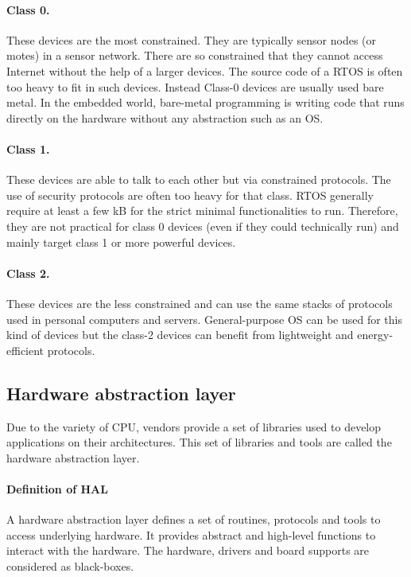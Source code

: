 \paragraph{Class 0.}
These devices are the most constrained.
They are typically sensor nodes (or motes) in a sensor network.
There are so constrained that they cannot access Internet without the help of a larger devices.
The source code of a RTOS is often too heavy to fit in such devices.
Instead Class-0 devices are usually used bare metal.
In the embedded world, bare-metal programming is writing code that runs directly on the hardware without any abstraction such as an OS.

\paragraph{Class 1.}
These devices are able to talk to each other but via constrained protocols.
The use of security protocols are often too heavy for that class.
RTOS generally require at least a few kB for the strict minimal functionalities to run.
Therefore, they are not practical for class 0 devices (even if they could technically run) and mainly target class 1 or more powerful devices.


\paragraph{Class 2.}
These devices are the less constrained and can use the same stacks of protocols used in personal computers and servers.
General-purpose OS can be used for this kind of devices but the class-2 devices can benefit from lightweight and energy-efficient protocols.

\subsection{Hardware abstraction layer}

Due to the variety of CPU, vendors provide a set of libraries used to develop applications on their architectures.
This set of libraries and tools are called the hardware abstraction layer.

\paragraph{Definition of HAL}
A hardware abstraction layer defines a set of routines, protocols and tools to access underlying hardware.
It provides abstract and high-level functions to interact with the hardware.
The hardware, drivers and board supports are considered as black-boxes.

